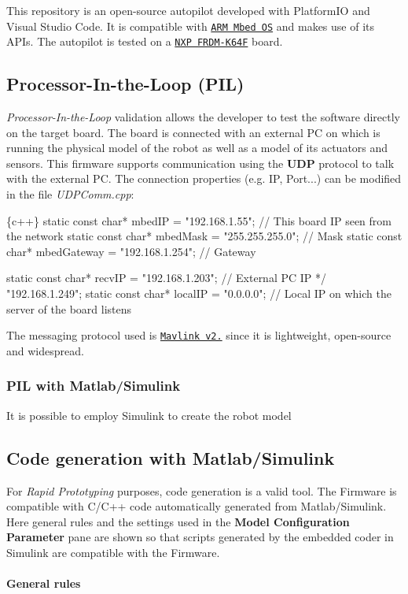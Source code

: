 This repository is an open-\/source autopilot developed with Platform\+IO and Visual Studio Code. It is compatible with \href{https://os.mbed.com/mbed-os/}{\tt A\+RM\textregistered{} Mbed\texttrademark{} OS} and makes use of its A\+P\+Is. The autopilot is tested on a \href{https://os.mbed.com/platforms/FRDM-K64F/}{\tt N\+XP F\+R\+D\+M-\/\+K64F} board. \subsection*{Processor-\/\+In-\/the-\/\+Loop (P\+IL)}

{\itshape Processor-\/\+In-\/the-\/\+Loop} validation allows the developer to test the software directly on the target board. The board is connected with an external PC on which is running the physical model of the robot as well as a model of its actuators and sensors. This firmware supports communication using the {\bfseries U\+DP} protocol to talk with the external PC. The connection properties (e.\+g. IP, Port...) can be modified in the file {\itshape U\+D\+P\+Comm.\+cpp}\+: 
\begin{DoxyCode}
\{c++\}
static const char*          mbedIP       = "192.168.1.55";      // This board IP seen from the network
static const char*          mbedMask     = "255.255.255.0";     // Mask
static const char*          mbedGateway  = "192.168.1.254";     // Gateway

static const char*          recvIP = "192.168.1.203";           // External PC IP */ "192.168.1.249";
static const char*          localIP = "0.0.0.0";                // Local IP on which the server of the
       board listens
\end{DoxyCode}
 The messaging protocol used is \href{https://mavlink.io/en/}{\tt Mavlink v2.} since it is lightweight, open-\/source and widespread. \subsubsection*{P\+IL with Matlab/\+Simulink\textregistered{}}

It is possible to employ Simulink to create the robot model

\subsection*{Code generation with Matlab/\+Simulink\textregistered{}}

For {\itshape Rapid Prototyping} purposes, code generation is a valid tool. The Firmware is compatible with C/\+C++ code automatically generated from Matlab/\+Simulink\textregistered{}. Here general rules and the settings used in the {\bfseries Model Configuration Parameter} pane are shown so that scripts generated by the embedded coder in Simulink are compatible with the Firmware. \paragraph*{General rules}

